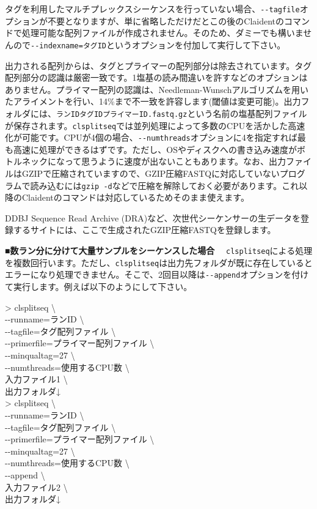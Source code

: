\documentclass[titlepage,10pt,a4paper]{jsbook}
\newenvironment{cmd}{\begin{oframed}\raggedright\ttfamily\footnotesize\setlength{\baselineskip}{1.4em}}{\end{oframed}\vspace{-1em}}
\begin{document}
タグを利用したマルチプレックスシーケンスを行っていない場合、\texttt{{-}{-}tagfile}オプションが不要となりますが、単に省略しただけだとこの後のClaidentのコマンドで処理可能な配列ファイルが作成されません。そのため、ダミーでも構いませんので\texttt{{-}{-}indexname=タグID}というオプションを付加して実行して下さい。

出力される配列からは、タグとプライマーの配列部分は除去されています。タグ配列部分の認識は厳密一致です。1塩基の読み間違いを許すなどのオプションはありません。プライマー配列の認識は、Needleman-Wunschアルゴリズムを用いたアライメントを行い、14\%まで不一致を許容します(閾値は変更可能)。出力フォルダには、\texttt{ランID{\textunderscore}{\textunderscore}タグID{\textunderscore}{\textunderscore}プライマーID.fastq.gz}という名前の塩基配列ファイルが保存されます。\texttt{clsplitseq}では並列処理によって多数のCPUを活かした高速化が可能です。CPUが4個の場合、\texttt{{-}{-}numthreads}オプションに4を指定すれば最も高速に処理ができるはずです。ただし、OSやディスクへの書き込み速度がボトルネックになって思うように速度が出ないこともあります。なお、出力ファイルはGZIPで圧縮されていますので、GZIP圧縮FASTQに対応していないプログラムで読み込むには\texttt{gzip -d}などで圧縮を解除しておく必要があります。これ以降のClaidentのコマンドは対応しているためそのまま使えます。

DDBJ Sequence Read Archive (DRA)など、次世代シーケンサーの生データを登録するサイトには、ここで生成されたGZIP圧縮FASTQを登録します。

\textbf{■数ラン分に分けて大量サンプルをシーケンスした場合　}
\texttt{clsplitseq}による処理を複数回行います。ただし、\texttt{clsplitseq}は出力先フォルダが既に存在しているとエラーになり処理できません。そこで、2回目以降は\texttt{{-}{-}append}オプションを付けて実行します。例えば以下のようにして下さい。
\begin{cmd}
{\textgreater} clsplitseq {\textbackslash}\\
{-}{-}runname=ランID {\textbackslash}\\
{-}{-}tagfile=タグ配列ファイル {\textbackslash}\\
{-}{-}primerfile=プライマー配列ファイル {\textbackslash}\\
{-}{-}minqualtag=27 {\textbackslash}\\
{-}{-}numthreads=使用するCPU数 {\textbackslash}\\
入力ファイル1 {\textbackslash}\\
出力フォルダ↓\\
{\textgreater} clsplitseq {\textbackslash}\\
{-}{-}runname=ランID {\textbackslash}\\
{-}{-}tagfile=タグ配列ファイル {\textbackslash}\\
{-}{-}primerfile=プライマー配列ファイル {\textbackslash}\\
{-}{-}minqualtag=27 {\textbackslash}\\
{-}{-}numthreads=使用するCPU数 {\textbackslash}\\
{-}{-}append {\textbackslash}\\
入力ファイル2 {\textbackslash}\\
出力フォルダ↓
\end{cmd}
\end{document}
